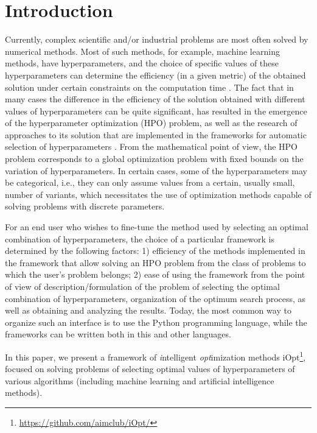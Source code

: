 \documentclass[iicol]{sn-jnl}
\theoremstyle{thmstyleone}%
\theoremstyle{thmstyletwo}%
\theoremstyle{thmstylethree}%
\begin{document}
\section{Introduction}\label{sec_intro}

Currently, complex scientific and/or industrial problems are most often solved by numerical methods. Most of such methods, for example, machine learning methods, have hyperparameters, and the choice of specific values of these hyperparameters can determine the efficiency (in a given metric) of the obtained solution under certain constraints on the computation time \citep{Hutter2019,nikitin2022automated}. The fact that in many cases the difference in the efficiency of the solution obtained with different values of hyperparameters can be quite significant, has resulted in the emergence of the hyperparameter optimization (HPO) problem, as well as the research of approaches to its solution that are implemented in the frameworks for automatic selection of hyperparameters \citep{Tune,optuna,hyperopt,Sherpa}. From the mathematical point of view, the HPO problem corresponds to a global optimization problem with fixed bounds on the variation of hyperparameters.  In certain cases, some of the hyperparameters may be categorical, i.e., they can only assume values from a certain, usually small, number of variants, which necessitates the use of optimization methods capable of solving problems with discrete parameters.

For an end user who wishes to fine-tune the method used by selecting an optimal combination of hyperparameters, the choice of a particular framework is determined by the following factors: 1) efficiency of the methods implemented in the framework that allow solving an HPO problem from the class of problems to which the user's problem belongs; 2) ease of using the  framework from the point of view of description/formulation of the problem of selecting the optimal combination of hyperparameters, organization of the optimum search process, as well as obtaining and analyzing the results. Today, the most common way to organize such an interface is to use the Python programming language, while the frameworks can be written both in this and other languages.

In this paper, we present a framework of \textit{i}ntelligent \textit{opt}imization methods  iOpt\footnote{\url{https://github.com/aimclub/iOpt/}}, focused on solving problems of selecting optimal values of hyperparameters of various algorithms (including machine learning and artificial intelligence methods). 
\end{document}
